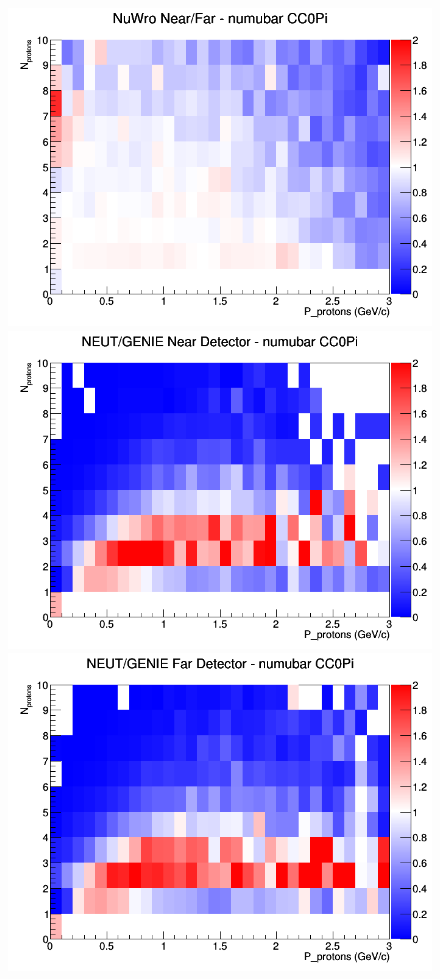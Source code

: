 \begin{figure}[h]
\endminipage
{}
\includegraphics[width=\linewidth]{N_P/nominal/protons/ratios/CC0Pi_NuWro_numubar_NF_N_P.png}
\endminipage
\newline
{}
\includegraphics[width=\linewidth]{N_P/nominal/protons/ratios/CC0Pi_NEUT_GENIE_numubar_near_N_P.png}
\endminipage
{}
\includegraphics[width=\linewidth]{N_P/nominal/protons/ratios/CC0Pi_NEUT_GENIE_numubar_far_N_P.png}

\end{figure}
